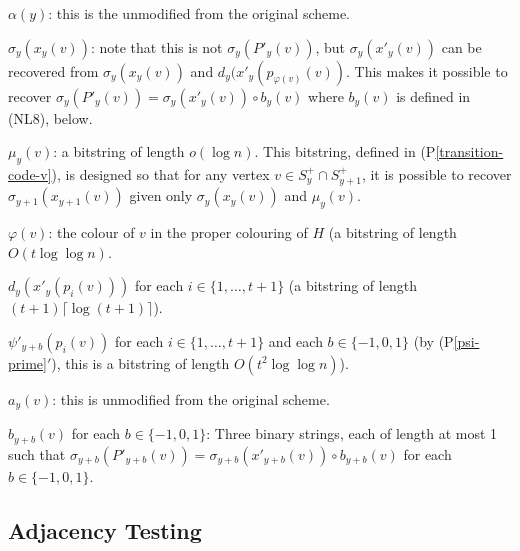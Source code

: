 \documentclass{patmorin}
\newcommand{\pref}[1]{(P\ref{#1})}
\newcommand{\psref}[1]{(P\ref{#1}$'$)}
\begin{document}
\begin{compactenum}[(NL1)]
    \item $\alpha(y)$: this is the unmodified from the original scheme.

    \item $\sigma_y(x_y(v))$: note that this is not $\sigma_y(P'_y(v))$, but
    $\sigma_y(x'_y(v))$ can be recovered from $\sigma_y(x_y(v))$ and $d_y(x'_y(p_{\varphi(v)}(v))$. This makes it possible to recover $\sigma_y(P'_y(v))=\sigma_y(x'_y(v))\mathbin{\circ} b_y(v)$ where $b_y(v)$ is defined in (NL8), below.

    \item $\mu_y(v)$: a bitstring of length $o(\log n)$.  This bitstring, defined in \pref{transition-code-v}, is designed so that for any vertex $v\in S^+_y\cap S^+_{y+1}$, it is possible to recover $\sigma_{y+1}(x_{y+1}(v))$ given only $\sigma_y(x_y(v))$ and $\mu_y(v)$.

    \item $\varphi(v)$: the colour of $v$ in the proper colouring of $H$ (a bitstring of length $O(t\log\log n)$.

    \item $d_y(x'_y(p_i(v)))$ for each $i\in\{1,\ldots,t+1\}$ (a bitstring of length $(t+1)\lceil\log(t+1)\rceil$).

    \item $\psi'_{y+b}(p_i(v))$ for each $i\in\{1,\ldots,t+1\}$ and each $b\in\{-1,0,1\}$ (by \psref{psi-prime}, this is a bitstring of length $O(t^2\log\log n)$).\label{psi-prime}

    \item $a_y(v)$: this is unmodified from the original scheme.

    \item $b_{y+b}(v)$ for each $b\in\{-1,0,1\}$: Three binary strings, each of length at most 1 such that $\sigma_{y+b}(P'_{y+b}(v))=\sigma_{y+b}(x'_{y+b}(v))\mathbin{\circ}b_{y+b}(v)$ for each $b\in\{-1,0,1\}$.
\end{compactenum}

\subsection{Adjacency Testing}
\end{document}
